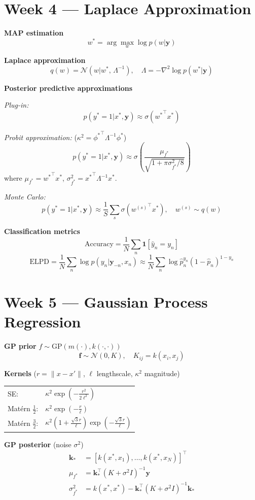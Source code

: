 \documentclass[9pt,a4paper]{extarticle}
\newcommand{\N}{\mathcal{N}}
\renewcommand{\vec}[1]{\bm{#1}}
\begin{document}
\section{Week 4 — Laplace Approximation}

\textbf{MAP estimation}
\[
w^* = \arg\max_w \log p(w|\vec{y})
\]

\textbf{Laplace approximation}
\[
q(w) = \N(w|w^*,\,\Lambda^{-1}), \quad \Lambda = -\nabla^2\log p(w^*|\vec{y})
\]

\textbf{Posterior predictive approximations}

\textit{Plug-in:}
\[
p(y^*=1|x^*,\vec{y}) \approx \sigma({w^*}^\top x^*)
\]

\textit{Probit approximation:} ($\kappa^2={\phi^*}^\top\Lambda^{-1}\phi^*$)
\[
p(y^*=1|x^*,\vec{y}) \approx \sigma\!\left(\frac{\mu_{f^*}}{\sqrt{1+\pi\sigma^2_{f^*}/8}}\right)
\]
where $\mu_{f^*}={w^*}^\top x^*$, $\sigma^2_{f^*}={x^*}^\top\Lambda^{-1}x^*$.

\textit{Monte Carlo:}
\[
p(y^*=1|x^*,\vec{y}) \approx \frac{1}{S}\sum_s \sigma({w^{(s)}}^\top x^*),\quad w^{(s)}\sim q(w)
\]

\textbf{Classification metrics}
\[
\text{Accuracy} = \frac{1}{N}\sum_n\mathbf{1}[\hat{y}_n=y_n]
\]
\[
\text{ELPD} = \frac{1}{N}\sum_n\log p(y_n|\vec{y}_{-n},x_n) \approx \frac{1}{N}\sum_n\log\hat{p}_n^{y_n}(1-\hat{p}_n)^{1-y_n}
\]

\section{Week 5 — Gaussian Process Regression}

\textbf{GP prior} $f\sim\mathrm{GP}(m(\cdot),k(\cdot,\cdot))$
\[
\vec{f}\sim\N(0,K),\quad K_{ij}=k(x_i,x_j)
\]

\textbf{Kernels} ($r=\|x-x'\|$, $\ell$ lengthscale, $\kappa^2$ magnitude)

\begin{tabular}{@{}ll@{}}
SE: & $\kappa^2\exp\!\left(-\tfrac{r^2}{2\ell^2}\right)$ \\
Mat\'ern $\tfrac{1}{2}$: & $\kappa^2\exp\!\left(-\tfrac{r}{\ell}\right)$ \\
Mat\'ern $\tfrac{3}{2}$: & $\kappa^2\!\left(1+\tfrac{\sqrt{3}r}{\ell}\right)\exp\!\left(-\tfrac{\sqrt{3}r}{\ell}\right)$
\end{tabular}

\textbf{GP posterior} (noise $\sigma^2$)
\begin{align*}
\vec{k}_* &= [k(x^*,x_1),\ldots,k(x^*,x_N)]^\top \\
\mu_{f^*} &= \vec{k}_*^\top(K+\sigma^2 I)^{-1}\vec{y} \\
\sigma^2_{f^*} &= k(x^*,x^*) - \vec{k}_*^\top(K+\sigma^2 I)^{-1}\vec{k}_*
\end{align*}
\end{document}
